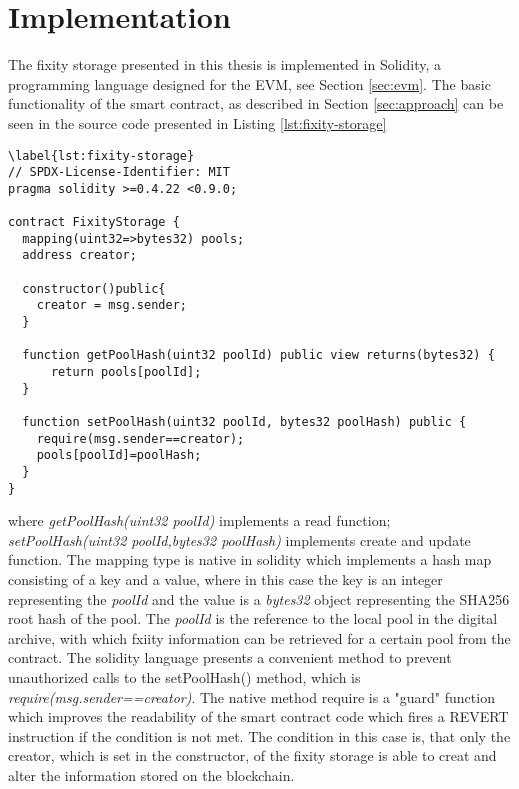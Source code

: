 \section{Implementation}
\label{sec:implementation}
The fixity storage presented in this thesis is implemented in Solidity, a programming language designed for the EVM, see Section \ref{sec:evm}.
The basic functionality of the smart contract, as described in Section \ref{sec:approach} can be seen in the source code presented in Listing \ref{lst:fixity-storage}
\begin{lstlisting}[language=Solidity,caption={MVP source code of the fixity storage deployed on the Ropsten test network https://ropsten.etherscan.io/address/0x18648B486Bd6B771DB957590E988A2464F22BfCd TODODODODO},label={lst:fixity-storage}]
    \label{lst:fixity-storage}
// SPDX-License-Identifier: MIT
pragma solidity >=0.4.22 <0.9.0;

contract FixityStorage {
  mapping(uint32=>bytes32) pools;
  address creator;

  constructor()public{
    creator = msg.sender;
  }

  function getPoolHash(uint32 poolId) public view returns(bytes32) {
      return pools[poolId];
  }

  function setPoolHash(uint32 poolId, bytes32 poolHash) public {
    require(msg.sender==creator);
    pools[poolId]=poolHash;
  }
}
\end{lstlisting}
where \textit{getPoolHash(uint32 poolId)} implements a read function; \textit{setPoolHash(uint32 poolId,bytes32 poolHash)} implements create and update function. The mapping type is native in solidity which implements a hash map consisting of a key and a value, where in this case the key is an integer representing the \textit{poolId} and the value is a \textit{bytes32} object representing the SHA256 root hash of the pool. The \textit{poolId} is the reference to the local pool in the digital archive, with which fxiity information can be retrieved for a certain pool from the contract. The solidity language presents a convenient  method to prevent unauthorized calls to the setPoolHash() method, which is \textit{require(msg.sender==creator)}. The native method require is a "guard" function which improves the readability of the smart contract code which fires a REVERT instruction if the condition is not met. The condition in this case is, that only the creator, which is set in the constructor, of the fixity storage is able to creat and alter the information stored on the blockchain.
